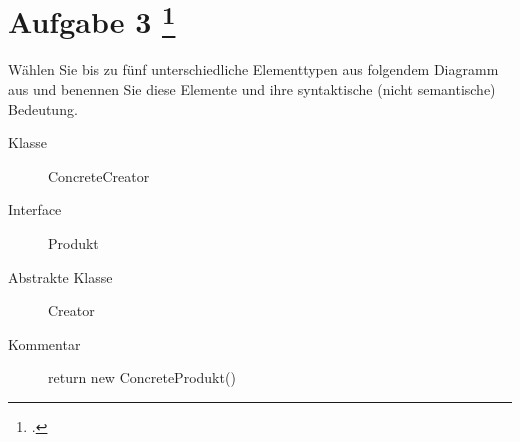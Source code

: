 \documentclass{lehramt-informatik-aufgabe}
\begin{document}
\section{Aufgabe 3
\footcite{examen:66116:2021:03}}

Wählen Sie bis zu fünf unterschiedliche Elementtypen aus folgendem
Diagramm aus und benennen Sie diese Elemente und ihre syntaktische
(nicht semantische) Bedeutung.

\begin{liAntwort}
\begin{description}
\item[Klasse] ConcreteCreator
\item[Interface] Produkt
\item[Abstrakte Klasse]  Creator
\item[Kommentar] return new ConcreteProdukt()
\end{description}
\end{liAntwort}
\end{document}
